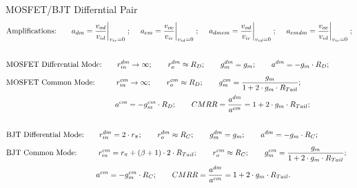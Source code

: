 \documentclass[11pt]{article}
\begin{document}
\begin{sectionbox}{MOSFET/BJT Differntial Pair}
\begin{align*}
& \text{Amplifications:} \qquad
  a_{dm} = \frac{v_{od}}{v_{id}} \bigg|_{v_{ic} = 0} \;; \; \quad
  a_{cm} = \frac{v_{oc}}{v_{ic}} \bigg|_{v_{id} = 0} \;; \; \quad
  a_{dmcm} = \frac{v_{od}}{v_{ic}} \bigg|_{v_{id} = 0} \;; \; \quad
  a_{cmdm} = \frac{v_{oc}}{v_{id}} \bigg|_{v_{ic} = 0} \;; \\[2em]
& \text{MOSFET Differential Mode:} \qquad
  r_{in}^{dm} \rightarrow \infty; \qquad
  r_o^{dm} \approx R_D; \qquad
  g_m^{dm} = g_m; \qquad
  a^{dm} = - g_m \cdot R_D; \\[0.5em]
& \text{MOSFET Common Mode:} \qquad \; \; \;
  r_{in}^{cm} \rightarrow \infty; \qquad
  r_o^{cm} \approx R_D; \qquad
  g_m^{cm} = \frac{g_m}{1 + 2 \cdot g_m \cdot R_{Tail}};  \\[0.1em]
& \hspace*{14.3em} a^{cm} = - g_m^{cm} \cdot R_D; \qquad
  CMRR = \frac{a^{dm}}{a^{cm}} = 1 + 2 \cdot g_m \cdot R_{Tail}; \\[2em]
& \text{BJT Differential Mode:} \qquad
  r_{in}^{dm} = 2 \cdot r_{\pi}; \qquad
  r_o^{dm} \approx R_C; \qquad
  g_m^{dm} = g_m; \qquad
  a^{dm} = - g_m \cdot R_C; \\[0.5em]
& \text{BJT Common Mode:} \qquad \; \; \;
  r_{in}^{cm} = r_{\pi} + (\beta + 1) \cdot 2 \cdot R_{Tail}; \qquad
  r_o^{cm} \approx R_C; \qquad
  g_m^{cm} = \frac{g_m}{1 + 2 \cdot g_m \cdot R_{Tail}}; \\[0.1em]
& \hspace*{11.8em} a^{cm} = - g_m^{cm} \cdot R_C; \qquad
  CMRR = \frac{a^{dm}}{a^{cm}} = 1 + 2 \cdot g_m \cdot R_{Tail}.
\end{align*}
\end{sectionbox}
\end{document}
